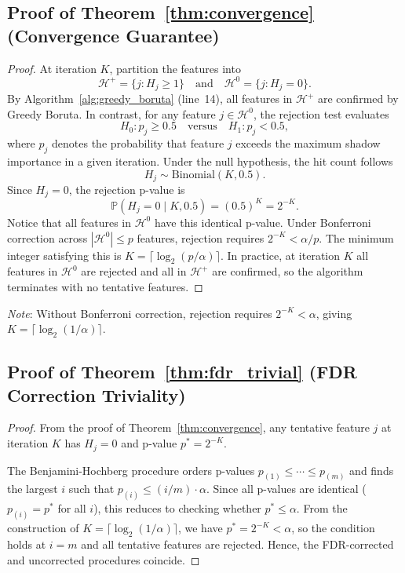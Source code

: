 \documentclass[runningheads]{llncs}
\begin{document}
\subsection{Proof of Theorem~\ref{thm:convergence} (Convergence Guarantee)}

\begin{proof}
At iteration $K$, partition the features into
$$
\mathcal{H}^{+} = \{j : H_j \geq 1\}
\quad\text{and}\quad
\mathcal{H}^{0} = \{j : H_j = 0\}.
$$
By Algorithm~\ref{alg:greedy_boruta} (line~14), all features in $\mathcal{H}^{+}$ are confirmed by Greedy Boruta. In contrast, for any feature $j \in \mathcal{H}^{0}$, the rejection test evaluates
$$
H_0 : p_j \geq 0.5
\quad \text{versus} \quad
H_1 : p_j < 0.5,
$$
where $p_j$ denotes the probability that feature $j$ exceeds the maximum shadow importance in a given iteration. Under the null hypothesis, the hit count follows
$$
H_j \sim \mathrm{Binomial}(K,0.5).
$$
Since $H_j = 0$, the rejection p-value is
$$
\mathbb{P}(H_j = 0 \mid K,0.5)
=
(0.5)^K
=
2^{-K}.
$$
Notice that all features in $\mathcal{H}^0$ have this identical p-value. Under Bonferroni correction across $|\mathcal{H}^0| \leq p$ features, rejection requires $2^{-K} < \alpha/p$. The minimum integer satisfying this is $K = \lceil \log_2(p/\alpha) \rceil$. In practice, at iteration $K$ all features in $\mathcal{H}^0$ are rejected and all in $\mathcal{H}^+$ are confirmed, so the algorithm terminates with no tentative features.
\end{proof}
\noindent
\textit{Note}: Without Bonferroni correction, rejection requires $2^{-K}  < \alpha$, giving $K = \lceil \log_2(1/\alpha) \rceil$. 

\subsection{Proof of Theorem~\ref{thm:fdr_trivial} (FDR Correction Triviality)}

\begin{proof}
From the proof of Theorem~\ref{thm:convergence}, any tentative feature $j$ at iteration $K$ has $H_j = 0$ and p-value $p^* = 2^{-K}$.

The Benjamini-Hochberg procedure orders p-values $p_{(1)} \leq \cdots \leq p_{(m)}$ and finds the largest $i$ such that $p_{(i)} \leq (i/m) \cdot \alpha$. Since all p-values are identical ($p_{(i)} = p^*$ for all $i$), this reduces to checking whether $p^* \leq \alpha$. From the construction of $K = \lceil \log_2(1/\alpha) \rceil$, we have $p^* = 2^{-K} < \alpha$, so the condition holds at $i = m$ and all tentative features are rejected. Hence, the FDR-corrected and uncorrected procedures coincide.
\end{proof}
\end{document}
